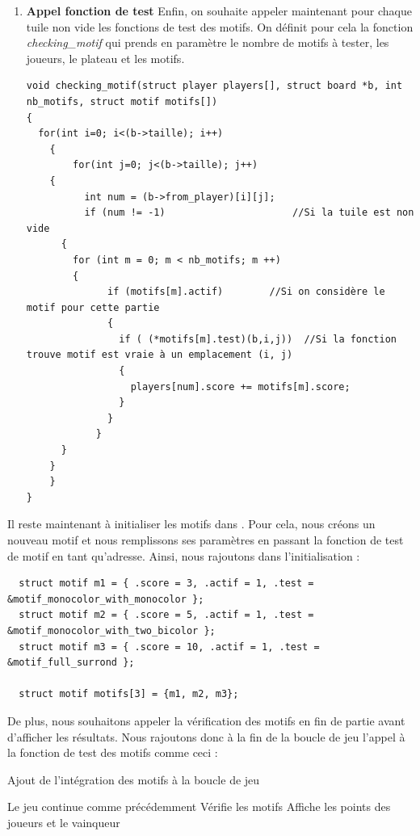 \documentclass[a4paper]{article}
\begin{document}
\begin{enumerate}
\item \textbf{Appel fonction de test}
Enfin, on souhaite appeler maintenant pour chaque tuile non vide les fonctions de test des motifs. On définit pour cela la fonction \emph{checking\_motif} qui prends en paramètre le nombre de motifs à tester, les joueurs, le plateau et les motifs.
    
\begin{lstlisting}
void checking_motif(struct player players[], struct board *b, int nb_motifs, struct motif motifs[])
{
  for(int i=0; i<(b->taille); i++)
    {
        for(int j=0; j<(b->taille); j++)
	{
          int num = (b->from_player)[i][j];
          if (num != -1)                      //Si la tuile est non vide
	  {
	    for (int m = 0; m < nb_motifs; m ++) 
	    {
              if (motifs[m].actif)        //Si on considère le motif pour cette partie
              {
                if ( (*motifs[m].test)(b,i,j))  //Si la fonction trouve motif est vraie à un emplacement (i, j)
                {
                  players[num].score += motifs[m].score;  
                }
              }
            }
	  }
	}
    }
}
\end{lstlisting}
\end{enumerate}

\newpage

Il reste maintenant à initialiser les motifs dans . Pour cela, nous créons un nouveau motif et nous remplissons ses paramètres en passant la fonction de test de motif en tant qu'adresse. 
Ainsi, nous rajoutons dans l'initialisation :

\begin{lstlisting}
  struct motif m1 = { .score = 3, .actif = 1, .test = &motif_monocolor_with_monocolor };
  struct motif m2 = { .score = 5, .actif = 1, .test = &motif_monocolor_with_two_bicolor };
  struct motif m3 = { .score = 10, .actif = 1, .test = &motif_full_surrond };

  struct motif motifs[3] = {m1, m2, m3};
\end{lstlisting}

De plus, nous souhaitons appeler la vérification des motifs en fin de partie avant d'afficher les résultats. Nous rajoutons donc à la fin de la boucle de jeu l'appel à la fonction de test des motifs comme ceci :

\begin{algorithm}
    \caption{Ajout de l'intégration des motifs à la boucle de jeu}
    \begin{algorithmic}
            \STATE Le jeu continue comme précédemment 
        \ENDWHILE
    \STATE Vérifie les motifs
    \STATE Affiche les points des joueurs et le vainqueur 
    \end{algorithmic}
\end{algorithm}
\end{document}
